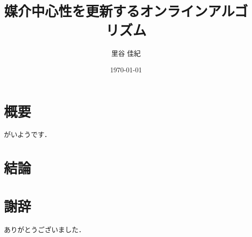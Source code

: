 \documentclass{jreport}
\title{媒介中心性を更新するオンラインアルゴリズム}
\author{里谷 佳紀}
\date{\today}
\begin{document}
\maketitle

\chapter*{概要}
がいようです．

\setcounter{tocdepth}{2}
\tableofcontents




\chapter{結論}

\chapter*{謝辞}
ありがとうございました．

\appendix

%
\printbibliography[title=参考文献]
\end{document}
